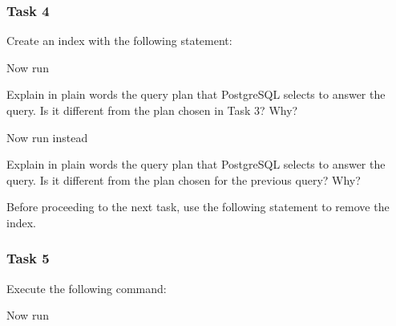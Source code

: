 \subsubsection{Task 4}

Create an index with the following statement:

\vgap

\noindent {}

\vgap

\noindent Now run

\vgap

\noindent {}

\vgap

\noindent Explain in plain words the query plan that PostgreSQL selects to answer the query. Is it different from the plan chosen in Task 3? Why?

\vgap

\noindent Now run instead

\vgap

\noindent {}

\vgap

\noindent Explain in plain words the query plan that PostgreSQL selects to answer the query. Is it different from the plan chosen for the previous query? Why?


\vgap

\noindent Before proceeding to the next task, use the following statement to remove the index.

\vgap

\noindent {}

\subsubsection{Task 5}

Execute the following command:

\vgap

\noindent {}

\vgap

\noindent Now run

\vgap

\noindent {} \\
 \\
 \\

